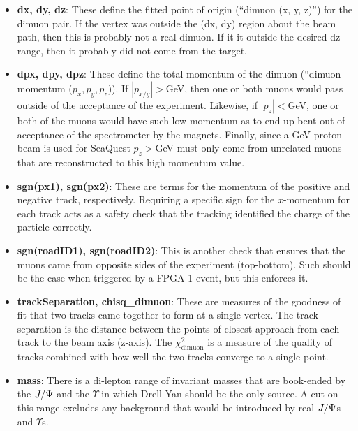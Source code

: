 \begin{itemize}
	\item \textbf{dx, dy, dz}: These define the fitted point of origin (``dimuon (x, y, z)'') for the dimuon pair. If the vertex was outside the (dx, dy) region about the beam path, then this is probably not a real dimuon. If it it outside the desired dz range, then it probably did not come from the target.
	\item \textbf{dpx, dpy, dpz}: These define the total momentum of the dimuon (``dimuon momentum ($p_x, p_y, p_z$)). If $|p_{x/y}|>$\unit[2]{GeV}, then one or both muons would pass outside of the acceptance of the experiment. Likewise, if $|p_{z}|<$\unit[30]{GeV}, one or both of the muons would have such low momentum as to end up bent out of acceptance of the spectrometer by the magnets. Finally, since a \unit[120]{GeV} proton beam is used for SeaQuest $p_{z}>$\unit[120]{GeV} must only come from unrelated muons that are reconstructed to this high momentum value.
	\item \textbf{sgn(px1), sgn(px2)}: These are terms for the momentum of the positive and negative track, respectively. Requiring a specific sign for the $x$-momentum for each track acts as a safety check that the tracking identified the charge of the particle correctly.
	\item \textbf{sgn(roadID1), sgn(roadID2)}: This is another check that ensures that the muons came from opposite sides of the experiment (top-bottom). Such should be the case when triggered by a FPGA-1 event, but this enforces it.
	\item \textbf{trackSeparation, chisq\_dimuon}: These are measures of the goodness of fit that two tracks came together to form at a single vertex. The track separation is the distance between the points of closest approach from each track to the beam axis (z-axis). The $\chi^2_{\text{dimuon}}$ is a measure of the quality of tracks combined with how well the two tracks converge to a single point.
	\item \textbf{mass}: There is a di-lepton range of invariant masses that are book-ended by the $J/\Psi$ and the $\Upsilon$ in which Drell-Yan should be the only source. A cut on this range excludes any background that would be introduced by real $J/\Psi$s and $\Upsilon$s.
\end{itemize}

